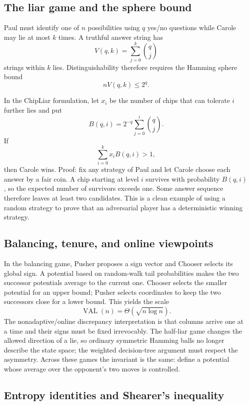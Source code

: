 \documentclass[10pt]{article}
\newcommand{\1}{\mathbf 1}
\begin{document}
\subsection{The liar game and the sphere bound}

Paul must identify one of $n$ possibilities using $q$ yes/no questions while
Carole may lie at most $k$ times.  A truthful answer string has
\[
 V(q,k)=\sum_{j=0}^k\binom qj
\]
strings within $k$ lies.  Distinguishability therefore requires the Hamming
sphere bound
\[
 nV(q,k)\leq2^q.                                      \tag{sphere bound}
\]

In the ChipLiar formulation, let $x_i$ be the number of chips that can tolerate
$i$ further lies and put
\[
 B(q,i)=2^{-q}\sum_{j=0}^i\binom qj.
\]
If
\[
 \sum_{i=0}^k x_iB(q,i)>1,
\]
then Carole wins.  Proof: fix any strategy of Paul and let Carole choose each
answer by a fair coin.  A chip starting at level $i$ survives with probability
$B(q,i)$, so the expected number of survivors exceeds one.  Some answer sequence
therefore leaves at least two candidates.  This is a clean example of using a
random strategy to prove that an adversarial player has a deterministic winning
strategy.

\subsection{Balancing, tenure, and online viewpoints}

In the balancing game, Pusher proposes a sign vector and Chooser selects its
global sign.  A potential based on random-walk tail probabilities makes the two
successor potentials average to the current one.  Chooser selects the smaller
potential for an upper bound; Pusher selects coordinates to keep the two
successors close for a lower bound.  This yields the scale
\[
 \operatorname{VAL}(n)=\Theta(\sqrt{n\log n}).
\]
The nonadaptive/online discrepancy interpretation is that columns arrive one at
a time and their signs must be fixed irrevocably.  The half-liar game changes
the allowed direction of a lie, so ordinary symmetric Hamming balls no longer
describe the state space; the weighted decision-tree argument must respect the
asymmetry.  Across these games the invariant is the same: define a potential
whose average over the opponent's two moves is controlled.

\subsection{Entropy identities and Shearer's inequality}
\end{document}
